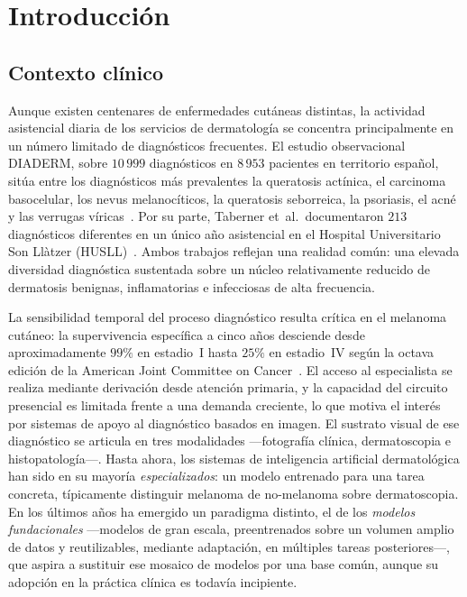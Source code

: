 
\chapter{Introducción}
\label{cap:intro}

\section{Contexto clínico}
\label{sec:contexto}

Aunque existen centenares de enfermedades cutáneas distintas, la
actividad asistencial diaria de los servicios de dermatología se
concentra principalmente en un número limitado de diagnósticos
frecuentes. El estudio observacional DIADERM, sobre $10\,999$
diagnósticos en $8\,953$ pacientes en territorio español, sitúa
entre los diagnósticos más prevalentes la queratosis actínica, el
carcinoma basocelular, los nevus melanocíticos, la queratosis
seborreica, la psoriasis, el acné y las verrugas
víricas~\cite{diaderm2018}. Por su parte, Taberner et~al.\
documentaron $213$ diagnósticos diferentes en un único año
asistencial en el Hospital Universitario Son Llàtzer
(HUSLL)~\cite{taberner2010_motivos}. Ambos trabajos reflejan una
realidad común: una elevada diversidad diagnóstica sustentada sobre
un núcleo relativamente reducido de dermatosis benignas,
inflamatorias e infecciosas de alta frecuencia.

La sensibilidad temporal del proceso diagnóstico resulta crítica en
el melanoma cutáneo: la supervivencia específica a cinco años
desciende desde aproximadamente $99\%$ en estadio~I hasta $25\%$ en
estadio~IV según la octava edición de la American Joint Committee on
Cancer~\cite{ajcc8}. El acceso al especialista se realiza mediante
derivación desde atención primaria, y la capacidad del circuito
presencial es limitada frente a una demanda creciente, lo que motiva
el interés por sistemas de apoyo al diagnóstico basados en imagen. El
sustrato visual de ese diagnóstico se articula en tres modalidades
---fotografía clínica, dermatoscopia e histopatología---. Hasta ahora,
los sistemas de inteligencia artificial dermatológica han sido en su
mayoría \emph{especializados}: un modelo entrenado para una tarea
concreta, típicamente distinguir melanoma de no-melanoma sobre
dermatoscopia. En los últimos años ha emergido un paradigma distinto,
el de los \emph{modelos fundacionales} ---modelos de gran escala,
preentrenados sobre un volumen amplio de datos y reutilizables,
mediante adaptación, en múltiples tareas posteriores---, que aspira a
sustituir ese mosaico de modelos por una base común, aunque su
adopción en la práctica clínica es todavía incipiente.


